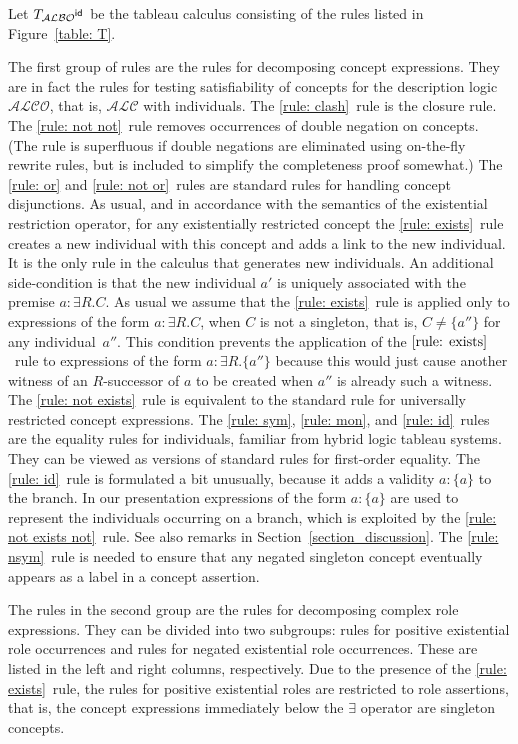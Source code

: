 \documentclass[leqno
,pdflatex
,prodmode
,acmtocl
]{acmsmall}
\newcommand{\mathcmd}[1]{\ensuremath{#1}\xspace}
\newcommand{\dlfont}{\mathcal}
\newcommand{\dl}[1]{\mathcmd{\dlfont{#1}}}
\newcommand{\idRole}{\mathcmd{\textsf{\upshape\mdseries id}}}
\newcommand{\ALBOid}{\dl{ALBO\smash[t]{\mbox{${}^{\idRole}$}}}}
\newcommand{\ALC}{\dl{ALC}}
\newcommand{\ALCO}{\dl{ALCO}}
\newcommand{\indiv}{a}
\begin{document}
Let $T_\ALBOid$ be the tableau calculus consisting of the rules listed
in Figure~\ref{table: T}.

The first group of rules are the rules for decomposing concept expressions. 
They are in fact the rules for testing satisfiability of concepts
for the description logic \ALCO, that is, \ALC with individuals.
The \eqref{rule: clash}~rule is the closure rule.
The \eqref{rule: not not}~rule removes occurrences of double negation on concepts. 
(The rule is superfluous if double negations are eliminated using
on-the-fly rewrite rules, but is included to 
simplify the completeness proof somewhat.)
The \eqref{rule: or} and \eqref{rule: not or}~rules are
standard rules for handling concept disjunctions.
As usual, and in accordance with the semantics of the existential
restriction operator, for any existentially restricted concept the
\eqref{rule: exists}~rule creates a new individual with this concept and
adds a link to the new individual.
It is the only rule in the calculus that generates new individuals.
An additional side-condition is that the new individual $\indiv'$
is uniquely associated with the premise $\indiv:\exists R.C$.
As usual we assume that the \eqref{rule: exists}~rule is applied only to expressions of the form
$\indiv:\exists R.C$, when $C$ is not a singleton, that is, $C\neq\{\indiv''\}$
for any individual~$\indiv''$.
This condition prevents the application of the
$\eqref{rule: exists}$~rule to expressions of the form $\indiv:\exists R.\{\indiv''\}$
because this would just cause another witness of an
$R$-successor of $\indiv$ to be created when $\indiv''$ is already such a witness.
The \eqref{rule: not exists}~rule is equivalent  to the standard rule for universally restricted concept expressions.
The \eqref{rule: sym}, \eqref{rule: mon}, and \eqref{rule: id}~rules
are the equality rules for individuals,
familiar from hybrid logic tableau systems. They can be viewed
as versions of standard rules for first-order equality.
The \eqref{rule: id}~rule is formulated a bit unusually, because
it adds a validity $\indiv:\{\indiv\}$ to the branch. In our
presentation expressions of the form $\indiv:\{\indiv\}$ are used to
represent the individuals occurring on
a branch, which is exploited by the \eqref{rule: not exists not}~rule. 
See also remarks in Section~\ref{section_discussion}.
The \eqref{rule: nsym}~rule is needed 
to ensure that any negated singleton concept
eventually appears as a label in a concept assertion.

The rules in the second group are the rules for decomposing
complex role expressions.
They can be divided into two subgroups:
rules for positive existential role occurrences and rules for
negated existential role occurrences.
These are listed in the left and right columns, respectively.
Due to the presence of the \eqref{rule: exists}~rule, the rules for positive
existential roles are restricted to role assertions, that is, the
concept expressions immediately below the $\exists$ operator are
singleton concepts.
\end{document}
